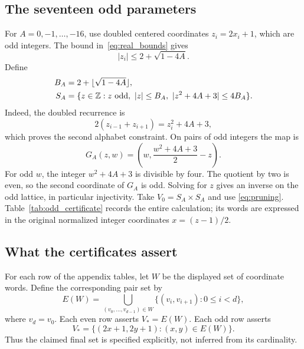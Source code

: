 \subsection{The seventeen odd parameters}

For \(A=0,-1,\ldots,-16\), use doubled centered coordinates
\(z_i=2x_i+1\), which are odd integers. The bound
in~\eqref{eq:real_bounds} gives
\[
 |z_i|\le2+\sqrt{1-4A}.
\]
Define
\begin{equation}
 \begin{split}
 B_A&=2+\lfloor\sqrt{1-4A}\rfloor,\\
 S_A&=\{z\in\mathbb{Z}:z\text{ odd},\ |z|\le B_A,
                         \ |z^2+4A+3|\le4B_A\}.
 \end{split}
 \label{eq:odd_finite_alphabet}
\end{equation}
Indeed, the doubled recurrence is
\begin{equation}
 2(z_{i-1}+z_{i+1})=z_i^2+4A+3,
 \label{eq:doubled_recurrence}
\end{equation}
which proves the second alphabet constraint. On pairs of odd integers
the map is
\begin{equation}
 G_A(z,w)=\left(w,\frac{w^2+4A+3}{2}-z\right).
 \label{eq:odd_finite_map}
\end{equation}
For odd \(w\), the integer \(w^2+4A+3\) is divisible by four.
The quotient by two is even, so the second coordinate of \(G_A\) is
odd. Solving for \(z\) gives an inverse on the odd lattice, in
particular injectivity. Take \(V_0=S_A\times S_A\) and use
\eqref{eq:pruning}. Table~\ref{tab:odd_certificate} records the entire
calculation; its words are expressed in the original normalized
integer coordinates \(x=(z-1)/2\).

\subsection{What the certificates assert}

For each row of the appendix tables, let \(W\) be the displayed set of
coordinate words. Define the corresponding pair set by
\begin{equation}
 E(W)=\bigcup_{(v_0,\ldots,v_{d-1})\in W}
       \{(v_i,v_{i+1}):0\le i<d\},
 \label{eq:word_expansion}
\end{equation}
where \(v_d=v_0\). Each even row asserts \(V_*=E(W)\). Each odd row
asserts
\[
 V_*=\{(2x+1,2y+1):(x,y)\in E(W)\}.
\]
Thus the claimed final set is specified explicitly, not inferred from
its cardinality.

